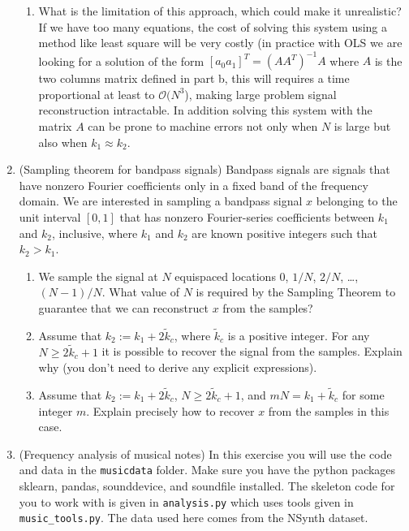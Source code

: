\documentclass[12pt,twoside]{article}
\begin{document}
\begin{enumerate}
\begin{enumerate}
  \item What is the limitation of this approach, which could make it unrealistic?\\
  If we have too many equations, the cost of solving this system using a method like least square will be very costly (in practice with OLS we are looking for a solution of the form $[a_0 a_1]^T = (A A^T )^{-1} A$ where $A$ is the two columns matrix defined in
  part b, this will requires a time proportional at least to $\mathcal{O}(N^3$), making large problem signal reconstruction intractable. In addition solving this system with the matrix $A$ can be prone to machine errors 
  not only when $N$ is large but also when $k_1 \approx k_2$.
  
\end{enumerate}
   
\newpage
   
\item (Sampling theorem for bandpass signals) Bandpass signals are signals that have nonzero Fourier coefficients
only in a fixed band of the frequency domain. We are interested in
sampling a bandpass signal $x$ belonging to the unit interval $[0,1]$
that has nonzero Fourier-series coefficients between $k_1$ and $k_2$,
inclusive, where $k_1$ and $k_2$ are known positive integers such that $k_2 > k_1$. 
\begin{enumerate}
\item We sample the signal at $N$ equispaced locations $0$, $1/N$, $2/N$, \ldots, $(N-1)/N$. What value of $N$ is required by the Sampling Theorem to guarantee that we can reconstruct $x$ from the samples?
\item Assume that $k_2:=k_1 + 2\tilde{k}_c$, where $\tilde{k}_c $ is a positive integer. For any $N \geq 2\tilde{k}_c + 1$ it is possible to recover the signal from the samples. Explain why (you don't need to derive any explicit expressions).
\item Assume that $k_2:=k_1 + 2\tilde{k}_c$, $N\geq 2\tilde{k}_c+1$,
  and $mN = k_1+\tilde{k}_c$ for some integer $m$. Explain precisely how to recover $x$ from the samples in this case.
\end{enumerate} 
 
 \newpage
 \item  (Frequency analysis of musical notes) In this exercise you will
  use the code and data in the \texttt{musicdata} folder.  Make sure you have
  the python packages sklearn, pandas, sounddevice, and soundfile
  installed.  The skeleton code for you to work with is given in
  \texttt{analysis.py} which uses tools given in
  \texttt{music\_tools.py}.  The data used here comes from the NSynth
  dataset.


\end{enumerate}
\end{document}
